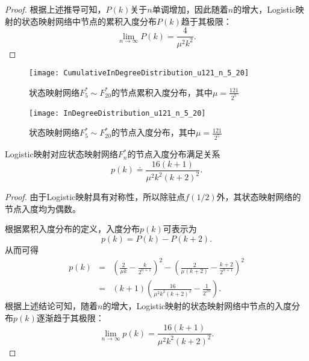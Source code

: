 \begin{proof}
根据上述推导可知，$P(k)$关于$n$单调增加，因此随着$n$的增大，Logistic映射的状态映射网络中节点的累积入度分布$P(k)$趋于其极限：
\begin{equation}
\lim\limits_{n \to \infty}P(k)=\frac{4}{\mu^{2}k^{2}}.
\end{equation}\qedsymbol
\end{proof}

\begin{figure}[!htb]
\centering
\texttt{[image: CumulativeInDegreeDistribution\_u121\_n\_5\_20]}
\caption{状态映射网络$F^*_{5} \sim F^*_{20}$的节点累积入度分布，其中$\mu=\frac{121}{2^{5}}$}
\label{fig:CumulativeInDegreeDistribution_u121_n_5_20}
\end{figure}

\begin{figure}[!htb]
\centering
\texttt{[image: InDegreeDistribution\_u121\_n\_5\_20]}
\caption{状态映射网络$F^*_{5} \sim F^*_{20}$的节点入度分布，其中$\mu=\frac{121}{2^{5}}$}
\label{fig:InDegreeDistribution_u121_n_5_20}
\end{figure}

\begin{Corollary}
\label{coro:indegreedistribute}
Logistic映射对应状态映射网络$F^*_n$的节点入度分布满足关系
\begin{equation*}
p(k)\doteq \frac{16(k+1)}{\mu^{2}k^{2}(k+2)^{2}}.
\end{equation*}
\end{Corollary}
\begin{proof}
由于Logistic映射具有对称性，所以除驻点$f(1/2)$外，其状态映射网络的节点入度均为偶数。

根据累积入度分布的定义，入度分布$p(k)$可表示为
\begin{equation*}
p(k)=P(k)-P(k+2).
\end{equation*}
从而可得
\begin{eqnarray*}
p(k) & = & \left( \frac{2}{\mu k}- \frac{k}{2^{n+1}} \right)^2 - \left( \frac{2}{\mu (k+2)}
                 - \frac{k+2}{2^{n+1}} \right)^2\\
     & = & (k+1) \left(\frac{16}{\mu^2 k^2 (k+2)^2} - \frac{1}{2^{2n}} \right).
\end{eqnarray*}
根据上述结论可知，随着$n$的增大，Logistic映射的状态映射网络中节点的入度分布$p(k)$逐渐趋于其极限：
\begin{equation}
\lim\limits_{n \to \infty} p(k)=\frac{16(k+1)}{\mu^2 k^2 (k+2)^2}.
\end{equation}\qedsymbol
\end{proof}

